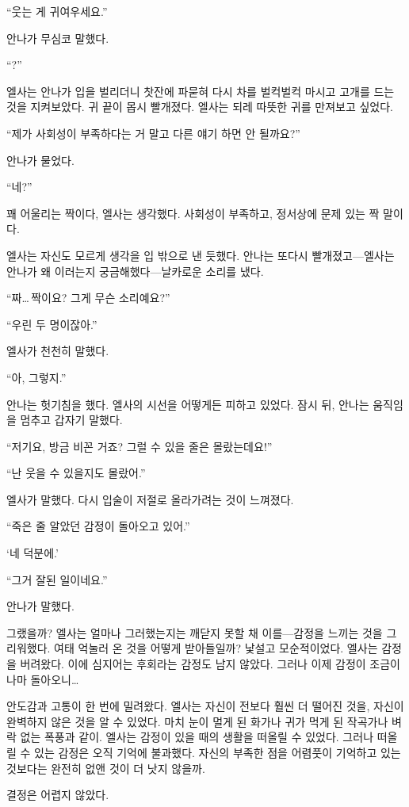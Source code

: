 ``웃는 게 귀여우세요.''

안나가 무심코 말했다.

``?''

엘사는 안나가 입을 벌리더니 찻잔에 파묻혀 다시 차를 벌컥벌컥 마시고 고개를 드는 것을 지켜보았다. 귀 끝이 몹시 빨개졌다. 엘사는 되레 따뜻한 귀를 만져보고 싶었다.

``제가 사회성이 부족하다는 거 말고 다른 얘기 하면 안 될까요?''

안나가 물었다.

``네?''

꽤 어울리는 짝이다, 엘사는 생각했다. 사회성이 부족하고, 정서상에 문제 있는 짝 말이다.

엘사는 자신도 모르게 생각을 입 밖으로 낸 듯했다. 안나는 또다시 빨개졌고—엘사는 안나가 왜 이러는지 궁금해했다—날카로운 소리를 냈다.

``짜\ldots\,짝이요? 그게 무슨 소리예요?''

``우린 두 명이잖아.''

엘사가 천천히 말했다.

``아, 그렇지.''

안나는 헛기침을 했다. 엘사의 시선을 어떻게든 피하고 있었다. 잠시 뒤, 안나는 움직임을 멈추고 갑자기 말했다.

``저기요, 방금 비꼰 거죠? 그럴 수 있을 줄은 몰랐는데요!''

``난 웃을 수 있을지도 몰랐어.''

엘사가 말했다. 다시 입술이 저절로 올라가려는 것이 느껴졌다.

``죽은 줄 알았던 감정이 돌아오고 있어.''

`네 덕분에.'

``그거 잘된 일이네요.''

안나가 말했다.

그랬을까? 엘사는 얼마나 그러했는지는 깨닫지 못할 채 이를—감정을 느끼는 것을 그리워했다. 여태 억눌러 온 것을 어떻게 받아들일까? 낯설고 모순적이었다. 엘사는 감정을 버려왔다. 이에 심지어는 후회라는 감정도 남지 않았다. 그러나 이제 감정이 조금이나마 돌아오니\ldots

안도감과 고통이 한 번에 밀려왔다. 엘사는 자신이 전보다 훨씬 더 떨어진 것을, 자신이 완벽하지 않은 것을 알 수 있었다. 마치 눈이 멀게 된 화가나 귀가 먹게 된 작곡가나 벼락 없는 폭풍과 같이. 엘사는 감정이 있을 때의 생활을 떠올릴 수 있었다. 그러나 떠올릴 수 있는 감정은 오직 기억에 불과했다. 자신의 부족한 점을 어렴풋이 기억하고 있는 것보다는 완전히 없앤 것이 더 낫지 않을까.

결정은 어렵지 않았다.

